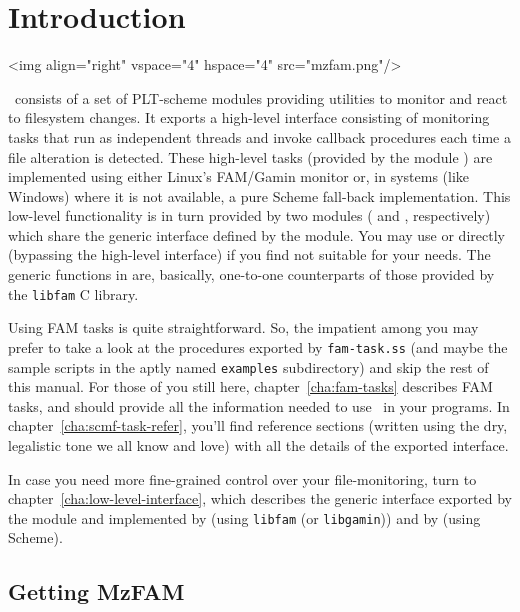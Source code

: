 
\chapter{Introduction}
\label{cha:introduction}

\htmlonly
\rawhtml<img align="right" vspace="4" hspace="4" src="mzfam.png"/>\endrawhtml
\endhtmlonly

\MzFam\ consists of a set of PLT-scheme modules providing utilities to
monitor and react to filesystem changes. It exports a high-level
interface consisting of monitoring tasks that run as independent
threads and invoke callback procedures each time a file alteration is
detected. These high-level tasks (provided by the module
) are implemented using either Linux's FAM/Gamin monitor
or, in systems (like Windows) where it is not available, a pure Scheme
fall-back implementation. This low-level functionality is in turn
provided by two modules ( and , respectively)
which share the generic interface defined by the 
module. You may use  or  directly (bypassing the
high-level interface) if you find  not suitable for your
needs. The generic functions in  are, basically,
one-to-one counterparts of those provided by the \texttt{libfam} C
library.


Using FAM tasks is quite straightforward. So, the impatient among you
may prefer to take a look at the procedures exported by
\texttt{fam-task.ss} (and maybe the sample scripts in the aptly named
\texttt{examples} subdirectory) and skip the rest of this manual. For
those of you still here, chapter~\ref{cha:fam-tasks} describes FAM
tasks, and should provide all the information needed to use \MzFam\ in
your programs. In chapter~\ref{cha:scmf-task-refer}, you'll find
reference sections (written using the dry, legalistic tone we all know
and love) with all the details of the exported 
interface.

In case you need more fine-grained control over your file-monitoring,
turn to chapter~\ref{cha:low-level-interface}, which describes the
generic interface exported by the  module and
implemented by  (using \texttt{libfam} (or
\texttt{libgamin})) and by  (using Scheme).


\section{Getting MzFAM}
\label{sec:getting-mzfam}

